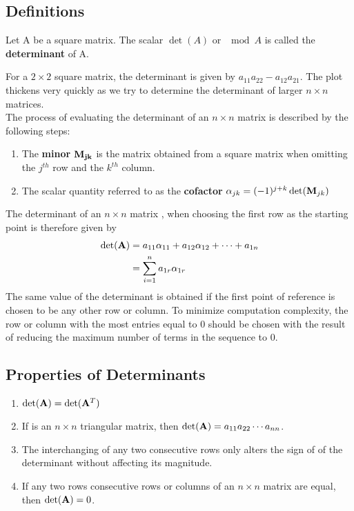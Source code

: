 

\subsection*{Definitions}

Let \matri A be a square matrix. The scalar $\det(A)$ or $\mod{A}$  is called the \textbf{determinant} of \matri A.

For a  $2 \times 2$ square matrix, the determinant is given by $a_{11}a_{22} - a_{12}a_{21}$. The plot thickens very quickly as we try to determine the determinant of larger $n \times n$ matrices.\\

The process of evaluating the determinant of an $n \times n$ matrix is described by the following steps:
\begin{enumerate}
  \item The \textbf{minor} $\mathbf{M_{jk}}$ is the matrix obtained from a square matrix when omitting the $j^{th}$ row and the $k^{th}$ column.
  \item The scalar quantity referred to as the \textbf{cofactor} $\alpha_{jk} = (-1)^{j+k} \det(\mathbf{M}_{jk})$
\end{enumerate}
The determinant of an $n \times n$ matrix , when choosing the first row as the starting point is therefore given by 
    \begin{align*}
  \det(\mathbf{A}) &= a_{11}\alpha_{11} + a_{12}\alpha_{12} + \cdots + a_{1n} \\
                 &= \sum_{i=1}^n a_{1r}\alpha_{1r}
\end{align*}
The same value of the determinant is obtained if the first point of reference is chosen to be any other row or column. To minimize computation complexity, the row or column with the most entries equal to 0 should be chosen with the result of reducing the maximum number of terms in the sequence to 0.

\subsection*{Properties of Determinants}

\begin{enumerate}
  \item $\det(\mathbf{A}) = \det(\mathbf{A}^T)$
  \item If  is an $n \times n$ triangular matrix, then $\det(\mathbf{A}) = a_{11}a_{22}\cdots a_{nn}$.
  \item The interchanging of any two consecutive rows only alters the sign of of the determinant without affecting its magnitude.
  \item If any two rows consecutive rows or columns of an $n \times n$ matrix  are equal, then $\det(\mathbf{A}) = 0$.
\end{enumerate}
